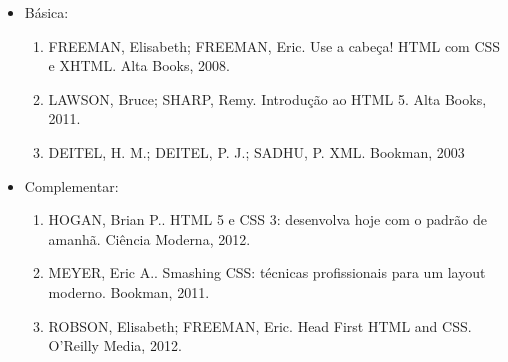 \begin{itemize} 

\item Básica:
    \begin{enumerate}

    \item FREEMAN, Elisabeth; FREEMAN, Eric.
          Use a cabeça! HTML com CSS e XHTML.
          Alta Books, 2008.
    
    \item LAWSON, Bruce; SHARP, Remy.
          Introdução ao HTML 5.
          Alta Books, 2011.
    
    \item DEITEL, H. M.; DEITEL, P. J.; SADHU, P.
          XML.
          Bookman, 2003
	
    \end{enumerate}

\item Complementar:
	\begin{enumerate} 

    \item HOGAN, Brian P..
          HTML 5 e CSS 3: desenvolva hoje com o padrão de amanhã.
          Ciência Moderna, 2012.

    \item MEYER, Eric A..
          Smashing CSS: técnicas profissionais para um layout moderno.
          Bookman, 2011.

    \item ROBSON, Elisabeth; FREEMAN, Eric.
          Head First HTML and CSS.
          O'Reilly Media, 2012.

	\end{enumerate}

\end{itemize}
